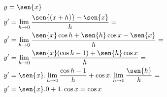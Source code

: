 \begin{ex}
\begin{align}
&y=\sen{x}\nonumber\\
&y'=\lim_{h\rightarrow 0} \frac{\sen{(x+h)}-\sen{x}}{h}=\nonumber\\
&y'=\lim_{h\rightarrow 0} \frac{\sen{x}\cos{h}+\sen{h}\cos{x}-\sen{x}}{h}=\nonumber\\
&y'=\lim_{h\rightarrow 0} \frac{\sen{x}(\cos{h}-1)+\sen{h}\cos{x}}{h}=\nonumber\\
&y'=\sen{x}.\lim_{h\rightarrow 0} \frac{\cos{h}-1}{h}+\cos{x}.\lim_{h\rightarrow 0} \frac{\sen{h}}{h}=\nonumber\\
&y'=\sen{x}.0+1.\cos{x}=\cos{x}\nonumber
\end{align}
\end{ex}